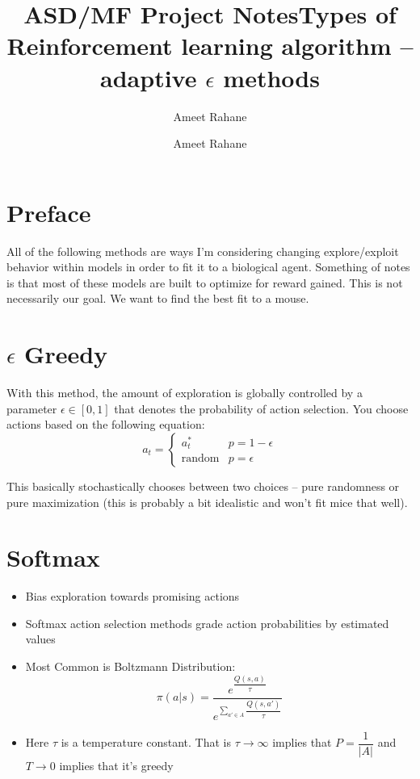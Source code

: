 \documentclass[10.5pt]{article}
\title{ASD/MF Project Notes}
\author{Ameet Rahane}
\begin{document}
\title{Types of Reinforcement learning algorithm -- adaptive $\epsilon$ methods}
\author{Ameet Rahane}
\maketitle
\date{}


\section{Preface}


All of the following methods are ways I'm considering changing explore/exploit behavior within models in order to fit it to a biological agent. Something of notes is that most of these models are built to optimize for reward gained. This is not necessarily our goal. We want to find the best fit to a mouse. 


\section{$\epsilon$ Greedy}

With this method, the amount of exploration is globally controlled by a parameter $\epsilon\in [0,1]$ that denotes the probability of action selection. You choose actions based on the following equation: 
\begin{equation}
a_t = \begin{cases}
a_t^* & p = 1-\epsilon\\
\text{random} & p = \epsilon
\end{cases}
\end{equation}

This basically stochastically chooses between two choices -- pure randomness or pure maximization (this is probably a bit idealistic and won't fit mice that well).

\section{Softmax}
\begin{itemize}
  \item Bias exploration towards promising actions
  \item Softmax action selection methods grade action probabilities by estimated values
  \item Most Common is Boltzmann Distribution: 
  \begin{equation}
\pi(a|s) = \dfrac{e^{\dfrac{Q(s,a)}{\tau}}}{e^{\sum_{a'\in A}\dfrac{Q(s,a')}{\tau}}}
  \end{equation}
  \item Here $\tau$ is a temperature constant. That is $\tau \to \infty$ implies that $P=\dfrac{1}{|A|}$ and $T\to 0$ implies that it's greedy
\end{itemize}
\end{document}

